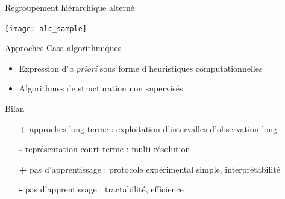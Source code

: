 \begin{frame}{Regroupement hiérarchique alterné}
\begin{center}
   \texttt{[image: alc\_sample]}  
\end{center}
\end{frame}

\begin{frame}{Approches Casa \fg algorithmiques \og}
\begin{itemize}
\item Expression d'\textit{a priori} sous forme d'heuristiques computationnelles
\item Algorithmes de structuration non supervisés
\end{itemize}
\begin{block}{Bilan}
\begin{itemize}
\item[\textbf{+}] approches long terme : exploitation d'intervalles d'observation long
\item[\alert{\textbf{-}}] représentation court terme : multi-résolution
\item[\textbf{+}] pas d'apprentissage : protocole expérimental simple, interprétabilité
\item[\alert{\textbf{-}}] pas d'apprentissage : tractabilité, efficience
\end{itemize}
\end{block}
\end{frame}